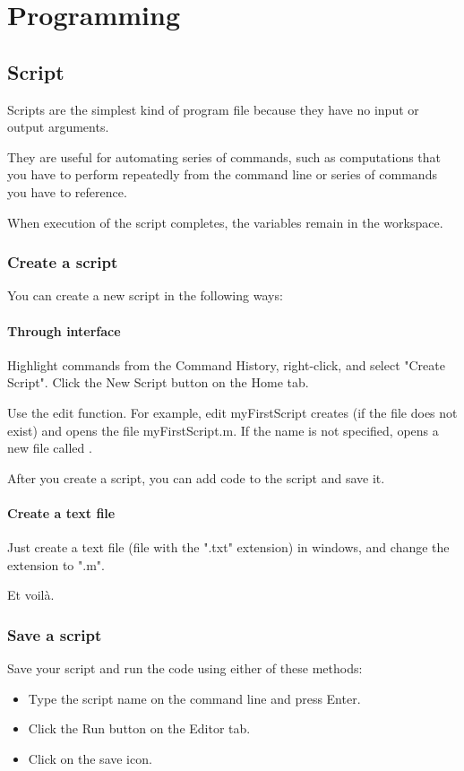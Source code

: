 \chapter{Programming}
\label{chap-code}

\section{Script}
	Scripts are the simplest kind of program file because they have no input or output arguments. 

	They are useful for automating series of \matlab commands, such as computations that you have to perform repeatedly from the command line or series of commands you have to reference.

	When execution of the script completes, the variables remain in the \matlab workspace. 

	\subsection{Create a script}
		You can create a new script in the following ways:
		\subsubsection{Through \matlab interface}

			Highlight commands from the Command History, right-click, and select "Create Script".
			Click the New Script  button on the Home tab.

			Use the edit function. For example, edit myFirstScript creates (if the file does not exist) and opens the file myFirstScript.m. If the name is not specified, \matlab opens a new file called .

			After you create a script, you can add code to the script and save it.

		\subsubsection{Create a text file}
			Just create a text file (file with the ".txt" extension) in windows, and change the extension to ".m".

		Et voilà.



	\subsection{Save a script}
		Save your script and run the code using either of these methods:
		\begin{itemize}
			\item Type the script name on the command line and press Enter. 
			\item Click the Run  button on the Editor tab.
			\item Click on the save icon.
		\end{itemize}

